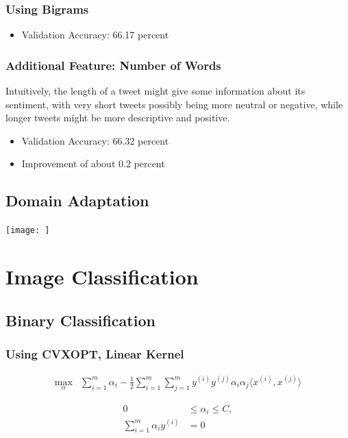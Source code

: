 \documentclass[12pt,a4paper]{article}
\begin{document}
\subsubsection{Using Bigrams}
\begin{itemize}
    \item Validation Accuracy: 66.17 percent
\end{itemize}

\subsubsection{Additional Feature: Number of Words}
Intuitively, the length of a tweet might give some information about its sentiment, with very short tweets possibly being more neutral or negative, while longer tweets might be more descriptive and positive.
\begin{itemize}
    \item Validation Accuracy: 66.32 percent
    \item Improvement of about 0.2 percent
\end{itemize}

\subsection{Domain Adaptation}
\texttt{[image: ]}

\section{Image Classification}
\subsection{Binary Classification}
\subsubsection{Using CVXOPT, Linear Kernel}

\begin{align*}
\max_{\alpha} & \sum_{i=1}^{m} \alpha_i - \frac{1}{2} \sum_{i=1}^{m} \sum_{j=1}^{m} y^{(i)} y^{(j)} \alpha_i \alpha_j \langle x^{(i)}, x^{(j)} \rangle
\end{align*}


\begin{align*}
0 & \leq \alpha_i \leq C, \\
\sum_{i=1}^{m} \alpha_i y^{(i)} & = 0
\end{align*}
\end{document}

